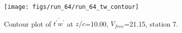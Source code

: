 \begin{figure}[H]
\centering
\texttt{[image: figs/run\_64/run\_64\_tw\_contour]}
\caption{Contour plot of $\overline{t^\prime w^\prime}$ at $z/c$=10.00, $V_{free}$=21.15, station 7.}
\end{figure}


